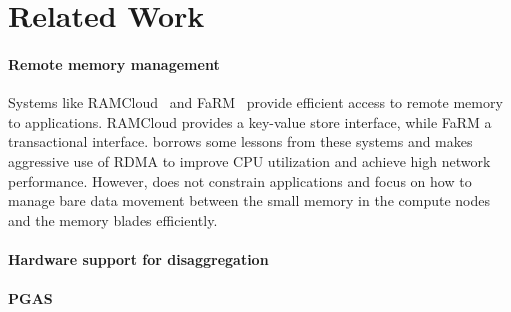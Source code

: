 \section{Related Work}
\label{sec:related_work}

\paragraph{Remote memory management} Systems like RAMCloud~\cite{ramcloud} and FaRM~\cite{farm} provide efficient access to remote memory to applications. RAMCloud provides a key-value store interface, while FaRM a transactional interface. \System borrows some lessons from these systems and makes aggressive use of RDMA to improve CPU utilization and achieve high network performance. However, \System does not constrain applications and focus on how to manage bare data movement between the small memory in the compute nodes and the memory blades efficiently.

\paragraph{Hardware support for disaggregation}

\paragraph{PGAS}

